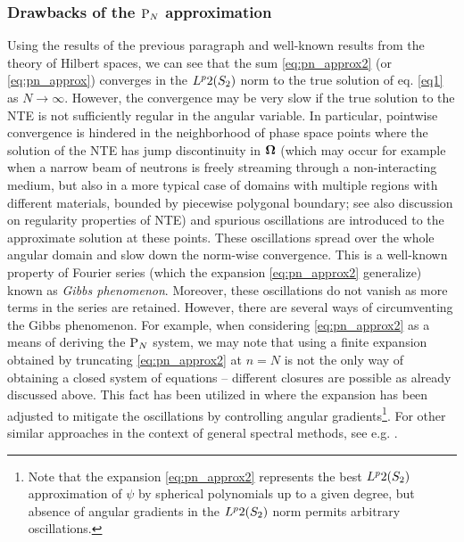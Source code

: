 \subsubsection{Drawbacks of the $\text{P}_{N}$ approximation}
Using the results of the previous paragraph and well-known results from the theory of Hilbert spaces, we can see that
the sum \eqref{eq:pn_approx2} (or \eqref{eq:pn_approx}) converges in the $L^{p}{2}(S_2)$ norm to the true solution of
eq. \eqref{eq1} as $N\to\infty$. However, the convergence may be very slow if the true solution to the NTE is not
sufficiently regular in the angular variable. In particular, pointwise convergence is hindered in the neighborhood of
phase space points where the solution of the NTE has jump discontinuity in $\mathbf{\Omega}$ (which may occur for example when a
narrow beam of neutrons is freely streaming through a non-interacting medium, but also in a more typical case of domains
with multiple regions with different materials, bounded by piecewise polygonal boundary; see also \alert{discussion on
regularity properties of NTE}) and spurious oscillations are introduced to the approximate solution at these points.
These oscillations spread over the whole angular domain and slow down the norm-wise convergence. This is a well-known
property of Fourier series (which the expansion \eqref{eq:pn_approx2} generalize) known as \textit{Gibbs phenomenon}.
Moreover, these oscillations do not vanish as more terms in the series are retained. However, there are several ways of
circumventing the Gibbs phenomenon. For example, when considering \eqref{eq:pn_approx2} as a means of deriving the $\text{P}_{N}$
system, we may note that using a finite expansion obtained by truncating \eqref{eq:pn_approx2} at $n=N$ is not the only
way of obtaining a closed system of equations -- different closures are possible as already discussed above. This fact
has been utilized in \cite{McClarren3} where the expansion has been adjusted to mitigate the oscillations by controlling
angular gradients\footnote{Note that the expansion \eqref{eq:pn_approx2} represents the best $L^{p}{2}(S_2)$
approximation of $\psi$ by spherical polynomials up to a given degree, but absence of angular gradients in the
$L^{p}{2}(S_2)$ norm permits arbitrary oscillations.}. For other similar approaches in the context of general spectral
methods, see e.g. \cite{Tanner}.

